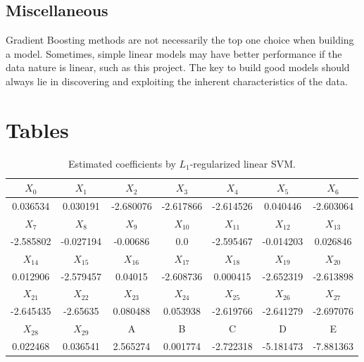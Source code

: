\documentclass[11pt]{article}
\begin{document}
\subsection{Miscellaneous}
Gradient Boosting methods are not necessarily the top one choice when building a model. Sometimes, simple linear models may have better performance if the data nature is linear, such as this project. The key to build good models should always lie in discovering and exploiting the inherent characteristics of the data.




\newpage
\appendix

\section{Tables}

\begin{table}[H]
    \centering
    \begin{tabular}{|c|c|c|c|c|c|c|}
         \hline
         $X_0$	& $X_1$	& $X_2$	& $X_3$	& $X_4$	& $X_5$	& $X_6$	\\
         \hline
         0.036534 & 0.030191 & -2.680076 & -2.617866 & -2.614526 & 0.040446 & -2.603064 \\
         \hline
         $X_7$	& $X_8$	& $X_9$	& $X_{10}$	& $X_{11}$	& $X_{12}$	& $X_{13}$	\\
         \hline
         -2.585802 & -0.027194 & -0.00686 & 0.0 & -2.595467 & -0.014203 & 0.026846 \\
         \hline
         $X_{14}$	& $X_{15}$	& $X_{16}$	& $X_{17}$	& $X_{18}$	& $X_{19}$	& $X_{20}$	\\
         \hline
         0.012906 & -2.579457 & 0.04015 & -2.608736 & 0.000415 & -2.652319 & -2.613898 \\
         \hline
         $X_{21}$	& $X_{22}$	& $X_{23}$	& $X_{24}$	& $X_{25}$	& $X_{26}$	& $X_{27}$	\\
         \hline
         -2.645435 & -2.65635 & 0.080488 & 0.053938 & -2.619766 & -2.641279 & -2.697076 \\
         \hline
         $X_{28}$	& $X_{29}$	& A	& B	& C	& D	& E	\\
         \hline
         0.022468 & 0.036541 & 2.565274 & 0.001774 & -2.722318 & -5.181473 & -7.881363 \\
         \hline
    \end{tabular}
    \caption{Estimated coefficients by $L_1$-regularized linear SVM.}
    \label{tab:svm-coef}
\end{table}
\end{document}
